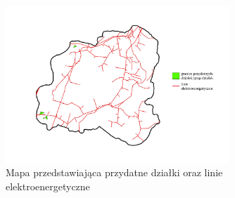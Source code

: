 \documentclass{article}
\begin{document}
\begin{figure}[H]
    \centering
    \includegraphics[width=0.75\textwidth]{img/plesna-dzialki-linie.jpg}
    \caption*{Mapa przedstawiająca przydatne działki oraz linie elektroenergetyczne}
\end{figure}
\end{document}
